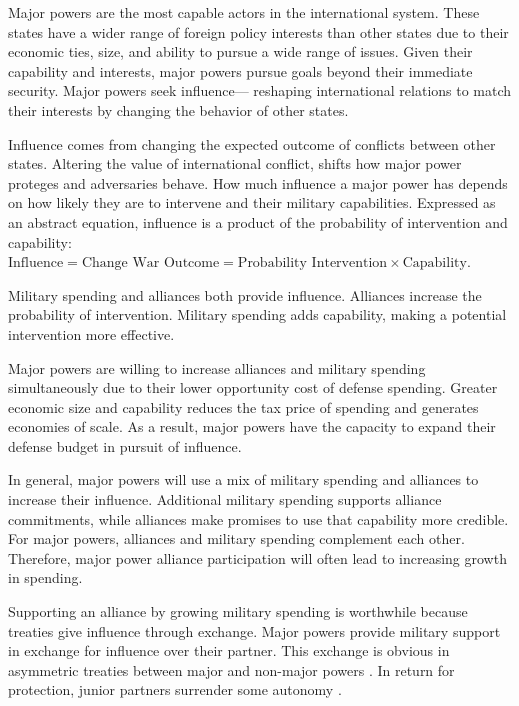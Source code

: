 \documentclass[12pt]{article}
\begin{document}
Major powers are the most capable actors in the international system. 
These states have a wider range of foreign policy interests than other states due to their economic ties, size, and ability to pursue a wide range of issues. 
Given their capability and interests, major powers pursue goals beyond their immediate security. 
Major powers seek influence--- reshaping international relations to match their interests by changing the behavior of other states. 


Influence comes from changing the expected outcome of conflicts between other states.
Altering the value of international conflict, shifts how major power proteges and adversaries behave.  
How much influence a major power has depends on how likely they are to intervene and their military capabilities. 
Expressed as an abstract equation, influence is a product of the probability of intervention and capability: $\mbox{Influence} = \mbox{Change War Outcome} = \mbox{Probability Intervention} \times \mbox{Capability}$.


Military spending and alliances both provide influence. 
Alliances increase the probability of intervention. 
Military spending adds capability, making a potential intervention more effective. 


Major powers are willing to increase alliances and military spending simultaneously due to their lower opportunity cost of defense spending. 
Greater economic size and capability reduces the tax price of spending and generates economies of scale. 
As a result, major powers have the capacity to expand their defense budget in pursuit of influence.  


In general, major powers will use a mix of military spending and alliances to increase their influence.
Additional military spending supports alliance commitments, while alliances make promises to use that capability more credible. 
For major powers, alliances and military spending complement each other. 
Therefore, major power alliance participation will often lead to increasing growth in spending. 


Supporting an alliance by growing military spending is worthwhile because treaties give influence through exchange. 
Major powers provide military support in exchange for influence over their partner. 
This exchange is obvious in asymmetric treaties between major and non-major powers \citep{Morrow1993}. 
In return for protection, junior partners surrender some autonomy \citep{Lake2009}. 
\end{document}
